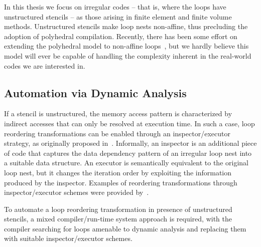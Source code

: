 In this thesis we focus on irregular codes -- that is, where the loops have unstructured stencils -- as those arising in finite element and finite volume methods. Unstructured stencils make loop nests non-affine, thus precluding the adoption of polyhedral compilation. Recently, there has been some effort on extending the polyhedral model to non-affine loops~\cite{sparse-poly-framework}, but we hardly believe this model will ever be capable of handling the complexity inherent in the real-world codes we are interested in. 


\subsection{Automation via Dynamic Analysis}
\label{sec:bkg:ie}

If a stencil is unstructured, the memory access pattern is characterized by indirect accesses that can only be resolved at execution time. In such a case, loop reordering transformations can be enabled through an inspector/executor strategy, as originally proposed in~\cite{ST-Saltz91}. Informally, an inspector is an additional piece of code that captures the data dependency pattern of an irregular loop nest into a suitable data structure. An executor is semantically equivalent to the original loop nest, but it changes the iteration order by exploiting the information produced by the inspector. Examples of reordering transformations through inspector/executor schemes were provided by~\cite{ST-StroutPLDI03}.

To automate a loop reordering transformation in presence of unstructured stencils, a mixed compiler/run-time system approach is required, with the compiler searching for loops amenable to dynamic analysis and replacing them with suitable inspector/executor schemes. 







